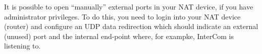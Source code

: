 It is possible to open ``manually'' external ports in your NAT device,
if you have administrator privileges. To do this, you need to login
into your NAT device (router) and configure an UDP data redirection
which should indicate an external (unused) port and the internal
end-point where, for exampke, InterCom is listening to.

